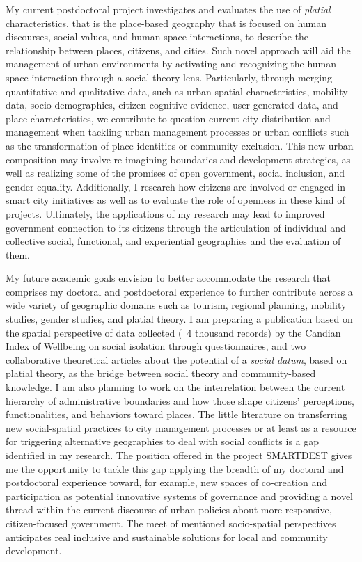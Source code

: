 
My current postdoctoral project investigates and evaluates the use of \emph{platial} characteristics, that is the place-based geography that is focused on human discourses, social values, and human-space interactions, to describe the relationship between places, citizens, and cities. Such novel approach will aid the management of urban environments by activating and recognizing the human-space interaction through a social theory lens. Particularly, through merging quantitative and qualitative data, such as urban spatial characteristics, mobility data, socio-demographics, citizen cognitive evidence, user-generated data, and place characteristics, we contribute to question current city distribution and management when tackling urban management processes or urban conflicts such as the transformation of place identities or community exclusion. This new urban composition may involve re-imagining boundaries and development strategies, as well as realizing some of the promises of open government, social inclusion, and gender equality. Additionally, I research how citizens are involved or engaged in smart city initiatives as well as to evaluate the role of openness in these kind of projects. Ultimately, the applications of my research may lead to improved government connection to its citizens through the articulation of individual and collective social, functional, and experiential geographies and the evaluation of them.\par



My future academic goals envision to better accommodate the research that comprises my doctoral and postdoctoral experience to further contribute across a wide variety of geographic domains such as tourism, regional planning, mobility studies, gender studies, and platial theory. I am preparing a publication based on the spatial perspective of data collected (~4 thousand records) by the Candian Index of Wellbeing on social isolation through questionnaires, and two collaborative theoretical articles about the potential of a \textit{social datum}, based on platial theory, as the bridge between social theory and community-based knowledge. I am also planning to work on the interrelation between the current hierarchy of administrative boundaries and how those shape citizens' perceptions, functionalities, and behaviors toward places. The little literature on transferring new social-spatial practices to city management processes or at least as a resource for triggering alternative geographies to deal with social conflicts is a gap identified in my research. The position offered in the project SMARTDEST gives me the opportunity to tackle this gap applying the breadth of my doctoral and postdoctoral experience toward, for example, new spaces of co-creation and participation as potential innovative systems of governance and providing a novel thread within the current discourse of urban policies about more responsive, citizen-focused government. The meet of mentioned socio-spatial perspectives anticipates real inclusive and sustainable solutions for local and community development.\par

